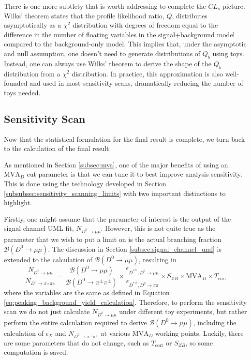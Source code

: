 There is one more subtlety that is worth addressing to complete the $CL_s$ picture. Wilks' theorem states that the profile likelihood ratio, $Q$, distributes asymptotically as a $\chi^2$ distribution with degrees of freedom equal to the difference in the number of floating variables in the signal+background model compared to the background-only model. This implies that, under the asymptotic and null assumption, one doesn't need to generate distributions of $Q_b$ using toys. Instead, one can always use Wilks' theorem to derive the shape of the $Q_b$ distribution from a $\chi^2$ distribution. In practice, this approximation is also well-founded and used in most sensitivity scans, dramatically reducing the number of toys needed. 

\subsection{Sensitivity Scan}
\label{subsec:sensitivity_scan}

Now that the statistical formulation for the final result is complete, we turn back to the calculation of the final result. 

As mentioned in Section \ref{subsec:mva}, one of the major benefits of using an $\text{MVA}_D$ cut parameter is that we can tune it to best improve analysis sensitivity. This is done using the technology developed in Section \ref{subsubsec:sensitivity_scanning_limits} with two important distinctions to highlight.

Firstly, one might assume that the parameter of interest is the output of the signal channel UML fit, $N_{D^0 \to \mu \mu}$. However, this is not quite true as the parameter that we wish to put a limit on is the actual branching fraction $\mathcal{B}(D^0 \to \mu \mu)$. The discussion in Section \ref{subsec:signal_channel_uml} is extended to the calculation of $\mathcal{B}(D^0 \to \mu \mu)$, resulting in 
\begin{equation}
    \frac{N_{D^0 \to \mu\mu}}{N_{D^0 \to \pi^\pm \pi^\pm}} = \frac{\mathcal{B}(D^0 \to \mu \mu)}{\mathcal{B}(D^0 \to \pi^\pm \pi^\pm)}\times \frac{\epsilon_{{D^*}^\pm, D^0\to\mu\mu}}{\epsilon_{{D^*}^\pm, D^0\to\pi\pi}} \times S_{ZB} \times \text{MVA}_D \times T_{\text{corr}} 
\end{equation}
where the variables are the same as defined in Equation \ref{eq:peaking_background_yield_calculation}. Therefore, to perform the sensitivity scan we do not just calculate $N_{D^0 \to \mu \mu}$ under different toy experiments, but rather perform the entire calculation required to derive $\mathcal{B}(D^0 \to \mu \mu)$, including the calculation of $\epsilon_X$ and $N_{D^0 \to \pi^\pm \pi^\pm}$ at various $\text{MVA}_D$ working points. Luckily, there are some parameters that do not change, such as $T_{\text{corr}}$ or $S_{ZB}$, so some computation is saved.

